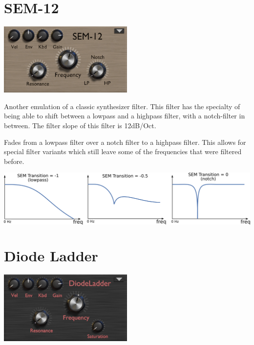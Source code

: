 \section{SEM-12}
\begin{center}
    \includegraphics[width=0.5\textwidth]{graphics/SEM_filter.png}
\end{center}

Another emulation of a classic synthesizer filter. This filter has the specialty of being able to shift between a lowpass and a highpass filter, with a notch-filter in between. The filter slope of this filter is 12dB/Oct.

{Fades from a lowpass filter over a notch filter to a highpass filter. This allows for special filter variants which still leave some of the frequencies that were filtered before.

    \begin{center}
        \includegraphics[width=\textwidth]{graphics/SEM_transition.png}
    \end{center}
}

\section{Diode Ladder}
\begin{center}
    \includegraphics[width=0.5\textwidth]{graphics/diode_filter.png}
\end{center}

